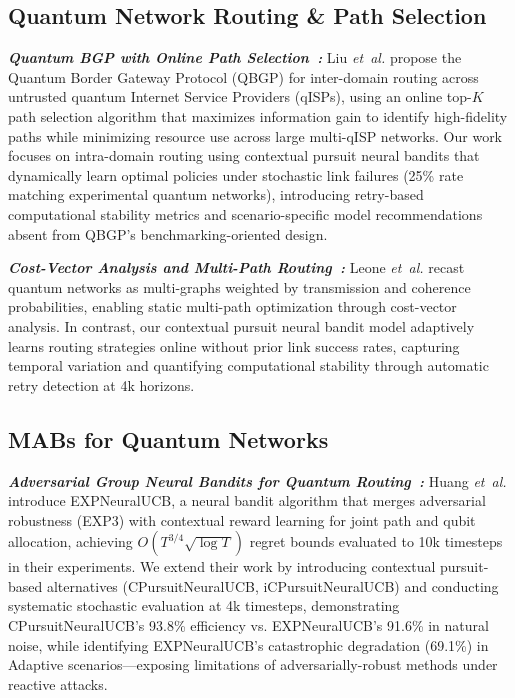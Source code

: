 \documentclass[sigconf,anonymous,review,natbib=false]{acmart}
\newcommand{\etal}{\emph{et~al.}\xspace}
\newcommand{\smallTitle}[1]{\vspace{1mm} \noindent \textbf{#1: }}
\begin{document}
\subsection{Quantum Network Routing \& Path Selection}

\textit{\smallTitle{Quantum BGP with Online Path Selection~\cite{liu2024qbgp}} }
Liu \etal propose the Quantum Border Gateway Protocol (QBGP) for inter-domain routing across untrusted quantum Internet Service Providers (qISPs), using an online top-$K$ path selection algorithm that maximizes information gain to identify high-fidelity paths while minimizing resource use across large multi-qISP networks.  
Our work focuses on intra-domain routing using contextual pursuit neural bandits that dynamically learn optimal policies under stochastic link failures (25\% rate matching experimental quantum networks), introducing retry-based computational stability metrics and scenario-specific model recommendations absent from QBGP's benchmarking-oriented design.

\noindent\textit{\smallTitle{Cost-Vector Analysis and Multi-Path Routing~\cite{smith2024costvector}} }
Leone \etal recast quantum networks as multi-graphs weighted by transmission and coherence probabilities, enabling static multi-path optimization through cost-vector analysis. In contrast, our contextual pursuit neural bandit model adaptively learns routing strategies online without prior link success rates, capturing temporal variation and quantifying computational stability through automatic retry detection at 4k horizons.

\subsection{MABs for Quantum Networks}

\textit{\smallTitle{Adversarial Group Neural Bandits for Quantum Routing~\cite{jie2024expneuralucb}} }
Huang \etal introduce EXPNeuralUCB, a neural bandit algorithm that merges adversarial robustness (EXP3) with contextual reward learning for joint path and qubit allocation, achieving $O(T^{3/4}\sqrt{\log T})$ regret bounds evaluated to 10k timesteps in their experiments. We extend their work by introducing contextual pursuit-based alternatives (CPursuitNeuralUCB, iCPursuitNeuralUCB) and conducting systematic stochastic evaluation at 4k timesteps, demonstrating CPursuitNeuralUCB's 93.8\% efficiency vs. EXPNeuralUCB's 91.6\% in natural noise, while identifying EXPNeuralUCB's catastrophic degradation (69.1\%) in Adaptive scenarios—exposing limitations of adversarially-robust methods under reactive attacks.
\end{document}
